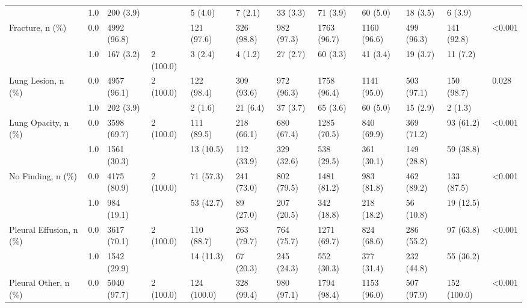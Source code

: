 \begin{tabular}{llllllllllll}
                       & 1.0 &             200 (3.9) &            &      5 (4.0) &     7 (2.1) &    33 (3.3) &     71 (3.9) &     60 (5.0) &    18 (3.5) &      6 (3.9) &         \\
Fracture, n (\%) & 0.0 &           4992 (96.8) &            &   121 (97.6) &  326 (98.8) &  982 (97.3) &  1763 (96.7) &  1160 (96.6) &  499 (96.3) &   141 (92.8) &  <0.001 \\
                       & 1.0 &             167 (3.2) &  2 (100.0) &      3 (2.4) &     4 (1.2) &    27 (2.7) &     60 (3.3) &     41 (3.4) &    19 (3.7) &     11 (7.2) &         \\
Lung Lesion, n (\%) & 0.0 &           4957 (96.1) &  2 (100.0) &   122 (98.4) &  309 (93.6) &  972 (96.3) &  1758 (96.4) &  1141 (95.0) &  503 (97.1) &   150 (98.7) &   0.028 \\
                       & 1.0 &             202 (3.9) &            &      2 (1.6) &    21 (6.4) &    37 (3.7) &     65 (3.6) &     60 (5.0) &    15 (2.9) &      2 (1.3) &         \\
Lung Opacity, n (\%) & 0.0 &           3598 (69.7) &  2 (100.0) &   111 (89.5) &  218 (66.1) &  680 (67.4) &  1285 (70.5) &   840 (69.9) &  369 (71.2) &    93 (61.2) &  <0.001 \\
                       & 1.0 &           1561 (30.3) &            &    13 (10.5) &  112 (33.9) &  329 (32.6) &   538 (29.5) &   361 (30.1) &  149 (28.8) &    59 (38.8) &         \\
No Finding, n (\%) & 0.0 &           4175 (80.9) &  2 (100.0) &    71 (57.3) &  241 (73.0) &  802 (79.5) &  1481 (81.2) &   983 (81.8) &  462 (89.2) &   133 (87.5) &  <0.001 \\
                       & 1.0 &            984 (19.1) &            &    53 (42.7) &   89 (27.0) &  207 (20.5) &   342 (18.8) &   218 (18.2) &   56 (10.8) &    19 (12.5) &         \\
Pleural Effusion, n (\%) & 0.0 &           3617 (70.1) &  2 (100.0) &   110 (88.7) &  263 (79.7) &  764 (75.7) &  1271 (69.7) &   824 (68.6) &  286 (55.2) &    97 (63.8) &  <0.001 \\
                       & 1.0 &           1542 (29.9) &            &    14 (11.3) &   67 (20.3) &  245 (24.3) &   552 (30.3) &   377 (31.4) &  232 (44.8) &    55 (36.2) &         \\
Pleural Other, n (\%) & 0.0 &           5040 (97.7) &  2 (100.0) &  124 (100.0) &  328 (99.4) &  980 (97.1) &  1794 (98.4) &  1153 (96.0) &  507 (97.9) &  152 (100.0) &  <0.001 \\

\end{tabular}
